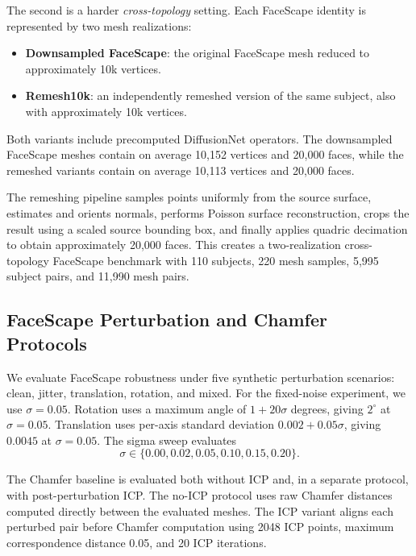 \documentclass{article}
\begin{document}
The second is a harder \emph{cross-topology} setting. Each FaceScape identity is
represented by two mesh realizations:
\begin{itemize}
    \item \textbf{Downsampled FaceScape}: the original FaceScape mesh reduced to
    approximately 10k vertices.
    \item \textbf{Remesh10k}: an independently remeshed version of the same
    subject, also with approximately 10k vertices.
\end{itemize}
Both variants include precomputed DiffusionNet operators. The downsampled
FaceScape meshes contain on average 10,152 vertices and 20,000 faces, while the
remeshed variants contain on average 10,113 vertices and 20,000 faces.

The remeshing pipeline samples points uniformly from the source surface,
estimates and orients normals, performs Poisson surface reconstruction, crops the
result using a scaled source bounding box, and finally applies quadric decimation
to obtain approximately 20,000 faces. This creates a two-realization
cross-topology FaceScape benchmark with 110 subjects, 220 mesh samples, 5,995
subject pairs, and 11,990 mesh pairs.

\subsection{FaceScape Perturbation and Chamfer Protocols}
\label{app:faceverse_perturbation_protocol}

We evaluate FaceScape robustness under five synthetic perturbation scenarios:
clean, jitter, translation, rotation, and mixed. For the fixed-noise experiment,
we use $\sigma=0.05$. Rotation uses a maximum angle of $1+20\sigma$ degrees,
giving $2^\circ$ at $\sigma=0.05$. Translation uses per-axis standard deviation
$0.002+0.05\sigma$, giving $0.0045$ at $\sigma=0.05$. The sigma sweep evaluates
\begin{equation}
\sigma \in \{0.00, 0.02, 0.05, 0.10, 0.15, 0.20\}.
\label{eq:faceverse_sigma_sweep}
\end{equation}

The Chamfer baseline is evaluated both without ICP and, in a separate protocol,
with post-perturbation ICP. The no-ICP protocol uses raw Chamfer distances
computed directly between the evaluated meshes. The ICP variant aligns each
perturbed pair before Chamfer computation using 2048 ICP points, maximum
correspondence distance 0.05, and 20 ICP iterations.
\end{document}
